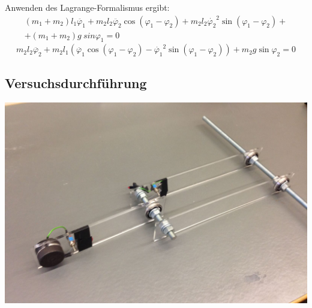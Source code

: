 \begin{frame}
	\begin{block}{Anwenden des Lagrange-Formalismus ergibt:}
		\small		
		\begin{equation}
		\begin{split}
			(m_1 + m_2) l_1\ddot{\varphi_1} + m_2 l_2 \ddot{\varphi_2} \cos (\varphi_1 - \varphi_2) + m_2 l_2 \dot{\varphi_2}^2 \sin (\varphi_1 - \varphi_2) +\\+ (m_1 + m_2) g \ sin \varphi_1 = 0
\end{split}
\end{equation}
\begin{equation}
m_2 l_2 \ddot{\varphi_2} + m_2 l_1 (\ddot{\varphi_1} \cos (\varphi_1 - \varphi_2) - \dot{\varphi_1}^2 \sin (\varphi_1 - \varphi_2)) + m_2 g \sin \varphi_2 = 0
		\end{equation}
	\end{block}
\end{frame}


\subsection{Versuchsdurchführung}
\begin{frame}
	\includegraphics[width=\textwidth]{images/4/foto-pendel}
\end{frame}

\begin{frame}
\end{frame}

